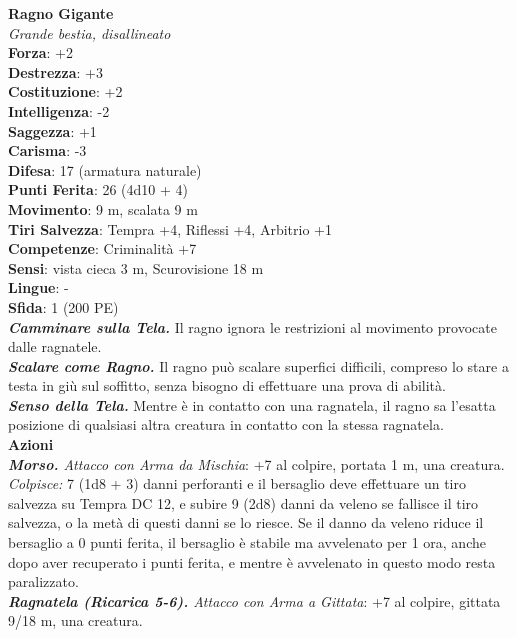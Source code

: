 \begin{multicols}{2}
\medskip\textbf{Ragno Gigante}\\
\emph{Grande bestia, disallineato}\\
\textbf{Forza}: +2\\
\textbf{Destrezza}: +3\\
\textbf{Costituzione}: +2\\
\textbf{Intelligenza}: -2\\
\textbf{Saggezza}: +1\\
\textbf{Carisma}: -3\\
\textbf{Difesa}: 17 (armatura naturale)\\
\textbf{Punti Ferita}: 26 (4d10 + 4)\\
\textbf{Movimento}: 9 m, scalata 9 m\\
\textbf{Tiri Salvezza}:  Tempra +4, Riflessi +4, Arbitrio +1 \\
\textbf{Competenze}: Criminalità +7\\
\textbf{Sensi}: vista cieca 3 m, Scurovisione 18 m\\
\textbf{Lingue}: -\\
\textbf{Sfida}: 1 (200 PE)\smallskip\\
\emph{\textbf{Camminare sulla Tela.}} Il ragno ignora le restrizioni al movimento provocate dalle ragnatele.\\
\emph{\textbf{Scalare come Ragno.}} Il ragno può scalare superfici difficili, compreso lo stare a testa in giù sul soffitto, senza bisogno di effettuare una prova di abilità.\\
\emph{\textbf{Senso della Tela.}} Mentre è in contatto con una ragnatela, il ragno sa l'esatta posizione di qualsiasi altra creatura in contatto con la stessa ragnatela.\\
\smallskip\textbf{Azioni}\\
\emph{\textbf{Morso.} Attacco con Arma da Mischia}: +7 al colpire, portata 1 m, una creatura.\\
\emph{Colpisce:} 7 (1d8 + 3) danni perforanti e il bersaglio deve effettuare un tiro salvezza su Tempra DC  12, e subire 9 (2d8) danni da veleno se fallisce il tiro salvezza, o la metà di questi danni se lo riesce. Se il danno da veleno riduce il bersaglio a 0 punti ferita, il bersaglio è stabile ma avvelenato per 1 ora, anche dopo aver recuperato i punti ferita, e mentre è avvelenato in questo modo resta paralizzato.\\

\emph{\textbf{Ragnatela (Ricarica 5-6).} Attacco con Arma a Gittata}: +7 al colpire, gittata 9/18 m, una creatura.\\


\end{multicols}
